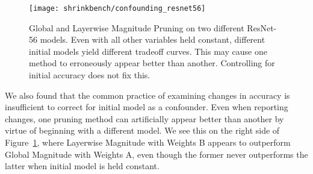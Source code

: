 \begin{figure}[t]
\begin{center}
\texttt{[image: shrinkbench/confounding\_resnet56]}
\caption{Global and Layerwise Magnitude Pruning on two different ResNet-56 models.
%
%
Even with all other variables held constant, different initial models yield different tradeoff curves. This may cause one method to erroneously appear better than another. Controlling for initial accuracy does not fix this. %
}
\label{fig:sb_resnet56_confounding}
\end{center}
\end{figure}
We also found that the common practice of examining changes in accuracy is insufficient to correct for initial model as a confounder. Even when reporting changes, one pruning method can artificially appear better than another by virtue of beginning with a different model. We see this on the right side of Figure~\ref{fig:sb_resnet56_confounding}, where Layerwise Magnitude with Weights B appears to outperform Global Magnitude with Weights A, even though the former never outperforms the latter when initial model is held constant.





